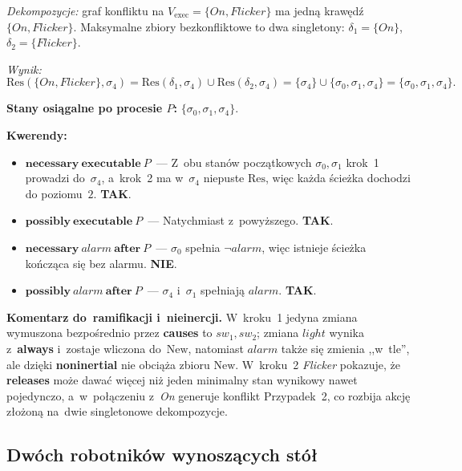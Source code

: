 \documentclass[11pt,a4paper]{article}
\newcommand{\causes}{\textbf{causes}}
\newcommand{\aft}{\textbf{after}}
\newcommand{\always}{\textbf{always}}
\newcommand{\releases}{\textbf{releases}}
\newcommand{\noninertial}{\textbf{noninertial}}
\newcommand{\necessary}{\textbf{necessary}}
\newcommand{\possibly}{\textbf{possibly}}
\newcommand{\executable}{\textbf{executable}}
\theoremstyle{definition}
\begin{document}
\smallskip\noindent
\emph{Dekompozycje:} graf konfliktu na $V_{\mathrm{exec}} = \{\mathit{On}, \mathit{Flicker}\}$
ma jedną krawędź $\{\mathit{On}, \mathit{Flicker}\}$. Maksymalne zbiory bezkonfliktowe to
dwa singletony: $\delta_1 = \{\mathit{On}\}$, $\delta_2 = \{\mathit{Flicker}\}$.

\smallskip\noindent
\emph{Wynik:}
\[
  \mathrm{Res}(\{\mathit{On}, \mathit{Flicker}\}, \sigma_4)
  = \mathrm{Res}(\delta_1, \sigma_4) \cup \mathrm{Res}(\delta_2, \sigma_4)
  = \{\sigma_4\} \cup \{\sigma_0, \sigma_1, \sigma_4\}
  = \{\sigma_0, \sigma_1, \sigma_4\}.
\]

\medskip
\noindent\textbf{Stany osiągalne po procesie $P$:} $\{\sigma_0, \sigma_1, \sigma_4\}$.

\medskip
\noindent\textbf{Kwerendy:}
\begin{itemize}
  \item $\necessary\ \executable\ P$~---
    Z~obu stanów początkowych $\sigma_0, \sigma_1$ krok~1 prowadzi do~$\sigma_4$,
    a~krok~2 ma w~$\sigma_4$ niepuste $\mathrm{Res}$,
    więc każda ścieżka dochodzi do poziomu~$2$. \textbf{TAK}.

  \item $\possibly\ \executable\ P$~---
    Natychmiast z~powyższego. \textbf{TAK}.

  \item $\necessary\ \mathit{alarm}\ \aft\ P$~---
    $\sigma_0$ spełnia $\neg\mathit{alarm}$, więc istnieje ścieżka kończąca się bez alarmu. \textbf{NIE}.

  \item $\possibly\ \mathit{alarm}\ \aft\ P$~---
    $\sigma_4$ i~$\sigma_1$ spełniają $\mathit{alarm}$. \textbf{TAK}.
\end{itemize}

\medskip
\noindent\textbf{Komentarz do~ramifikacji i~nieinercji.}
W~kroku~1 jedyna zmiana wymuszona bezpośrednio przez \causes{} to $\mathit{sw_1}, \mathit{sw_2}$;
zmiana $\mathit{light}$ wynika z~\always{} i~zostaje wliczona do~$\mathrm{New}$,
natomiast $\mathit{alarm}$ także się zmienia ,,w~tle'', ale dzięki \noninertial{}
nie obciąża zbioru $\mathrm{New}$. W~kroku~2 \textit{Flicker} pokazuje, że \releases{}
może dawać więcej niż jeden minimalny stan wynikowy nawet pojedynczo, a~w~połączeniu
z~\textit{On} generuje konflikt Przypadek~2, co rozbija akcję złożoną na~dwie
singletonowe dekompozycje.

\subsection{Dwóch robotników wynoszących stół}
\label{sec:ex-table}
\end{document}
